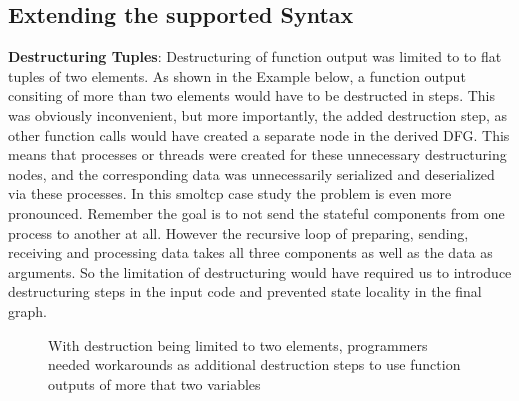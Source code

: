 \subsection{Extending the supported Syntax}
\textbf{Destructuring Tuples}: Destructuring of function output was limited to to flat tuples of two elements. As shown in the Example below, a function output consiting of more than two elements would have to be destructed in steps. This was obviously inconvenient, but more importantly, the added destruction step, as other function calls would have created a separate node in the derived DFG. This means that processes or threads were created for these unnecessary destructuring nodes, and the corresponding data was unnecessarily serialized and deserialized via these processes. In this smoltcp case study the problem is even more pronounced. Remember the goal is to not send the stateful components from one process to another at all. However the recursive loop of preparing, sending, receiving and processing data takes all three components as well as the data as arguments. So the limitation of destructuring would have required us to introduce destructuring steps in the input code and prevented state locality in the final graph. 
\begin{figure}[H]
\centering
\tabskip=0pt
\caption{With destruction being limited to two elements, programmers needed workarounds as additional destruction steps to use function outputs of more that two variables}
\label{fig:TypePropagationExample}
\end{figure}


